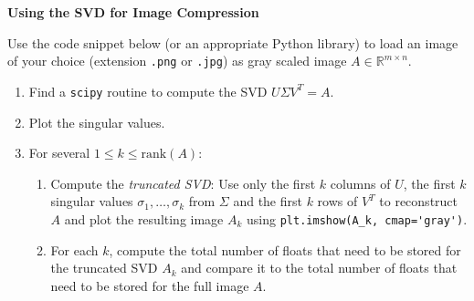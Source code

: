 \textbf{\normalsize Using the SVD for Image Compression}

Use the code snippet below (or an appropriate Python library) to load an image of your choice (extension \verb|.png| or \verb|.jpg|) as gray scaled image $A \in \mathbb{R}^{m \times n}$.
\begin{enumerate}
	\item Find a \verb|scipy| routine to compute the SVD $U\Sigma V^T = A$.
	\item Plot the singular values.
	\item For several $1 \leq k \leq \text{rank}(A)$:
	\begin{enumerate}
		\item Compute the \textit{truncated SVD}: Use only the first $k$ columns of $U$, the first $k$ singular values $\sigma_1, \ldots, \sigma_k$ from $\Sigma$ and the first $k$ rows of $V^T$ to reconstruct $A$ and plot the resulting image $A_k$ using \verb|plt.imshow(A_k, cmap='gray')|.
		\item For each $k$, compute the total number of floats that need to be stored for the truncated SVD $A_k$ and compare it to the total number of floats that need to be stored for the full image $A$.
	\end{enumerate} 
\end{enumerate}


